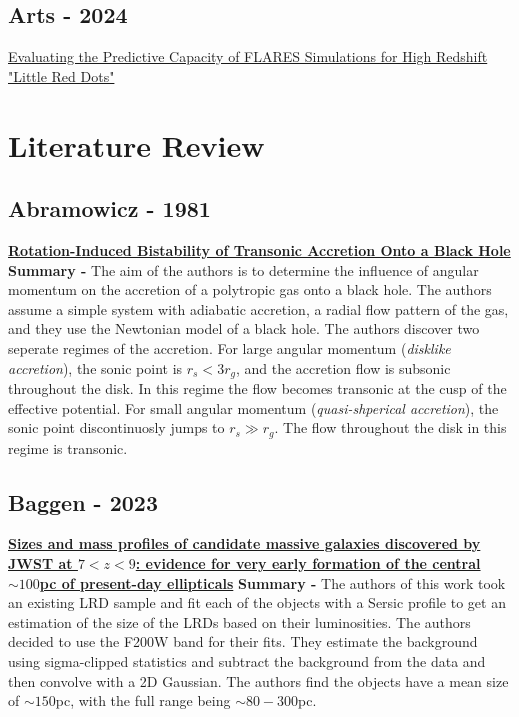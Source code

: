 \documentclass{article}
\begin{document}
\subsection*{Arts - 2024}
\href{https://ui.adsabs.harvard.edu/abs/2024arXiv241205946A/abstract}{Evaluating the Predictive Capacity of FLARES Simulations for High Redshift "Little Red Dots"}

\section*{Literature Review}

\subsection*{Abramowicz - 1981}
\href{https://ui.adsabs.harvard.edu/abs/1981ApJ...246..314A/abstract}{\textbf{Rotation-Induced Bistability of Transonic Accretion Onto a Black Hole}}
\newline \textbf{Summary -} The aim of the authors is to determine the influence of angular momentum on the accretion of a polytropic gas onto a black hole. The authors assume a simple system with adiabatic accretion, a radial flow pattern of the gas, and they use the Newtonian model of a black hole. The authors discover two seperate regimes of the accretion. For large angular momentum (\textit{disklike accretion}), the sonic point is $r_s < 3r_g$, and the accretion flow is subsonic throughout the disk. In this regime the flow becomes transonic at the cusp of the effective potential. For small angular momentum (\textit{quasi-shperical accretion}), the sonic point discontinuosly jumps to $r_s \gg r_g$. The flow throughout the disk in this regime is transonic.

\subsection*{Baggen - 2023}
\href{https://ui.adsabs.harvard.edu/abs/2023ApJ...955L..12B}{\textbf{Sizes and mass profiles of candidate massive galaxies discovered by JWST at $7 < z < 9$: evidence for very early formation of the central $\sim 100$pc of present-day ellipticals}}
\newline \textbf{Summary -} The authors of this work took an existing LRD sample and fit each of the objects with a Sersic profile to get an estimation of the size of the LRDs based on their luminosities. The authors decided to use the F200W band for their fits. They estimate the background using sigma-clipped statistics and subtract the background from the data and then convolve with a 2D Gaussian. The authors find the objects have a mean size of $\sim 150$pc, with the full range being $\sim 80-300$pc. 
\end{document}
